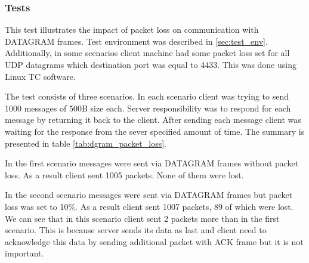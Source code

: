 \subsubsection{Tests}
This test illustrates the impact of packet loss on communication with DATAGRAM frames.
Test environment was described in \ref{sec:test_env}.
Additionally, in some scenarios client machine had some packet loss set for all UDP datagrams which destination port was equal to 4433.
This was done using Linux TC software. 

The test consists of three scenarios.
In each scenario client was trying to send 1000 messages of 500B size each.
Server responsibility was to respond for each message by returning it back to the client.
After sending each message client was waiting for the response from the sever specified amount of time.
The summary is presented in table \ref{tab:dgram_packet_loss}.

\begin{table}
\centering
{}
\caption{\label{tab:dgram_packet_loss}Number of packets sent with and without packet loss for DATAGRAM frames.}
\end{table}

In the first scenario messages were sent via DATAGRAM frames without packet loss.
As a result client sent 1005 packets. None of them were lost.

In the second scenario messages were sent via DATAGRAM frames but packet loss was set to 10\%.
As a result client sent 1007 packets, 89 of which were lost. 
We can see that in this scenario client sent 2 packets more than in the first scenario.
This is because server sends its data as last and client need to acknowledge this data by sending additional packet with ACK frame but it is not important.

